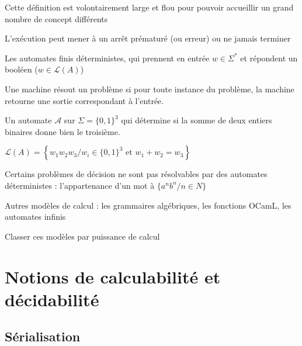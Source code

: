 \begin{rem}
	Cette définition est volontairement large et flou pour pouvoir accueillir un grand nombre de concept différents
\end{rem}

\begin{rem}
	L'exécution peut mener à un arrêt prématuré (ou erreur) ou ne jamais terminer
\end{rem}

\begin{example}
	Les automates finis déterministes, qui prennent en entrée $w\in \Sigma^*$ et répondent un booléen ($w \in \mathcal L(A)$)
\end{example}

\begin{definition}
	Une machine résout un problème si pour toute instance du problème, la machine retourne une sortie correspondant à l'entrée.
\end{definition}

\begin{example}
	Un automate $\mathcal A$ sur $\Sigma = \{0, 1\}^3$ qui détermine si la somme de deux entiers binaires donne bien le troisième.
	
	$\mathcal L(A) = \left\{w_1w_2w_3 / w_i\in \{0, 1\}^3 \text{ et } w_1 + w_2 = w_3\right\}$ 
\end{example}

\begin{rem}
	Certains problèmes de décision ne sont pas résolvables par des automates déterministes : l'appartenance d'un mot à $\{a^n b^n / n\in N\}$
\end{rem}

\begin{definition}
	Autres modèles de calcul : les grammaires algébriques, les fonctions OCamL, les automates infinis
\end{definition}

\begin{exercise}
	Classer ces modèles par puissance de calcul
\end{exercise}

\section{Notions de calculabilité et décidabilité}

\subsection{Sérialisation}

